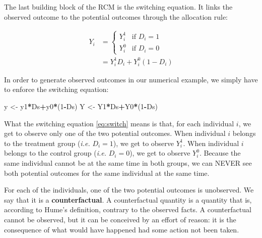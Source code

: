 \documentclass[]{book}
\newenvironment{Shaded}{\begin{snugshade}}{\end{snugshade}}
\newcommand{\DecValTok}[1]{\textcolor[rgb]{0.00,0.00,0.81}{#1}}
\newcommand{\StringTok}[1]{\textcolor[rgb]{0.31,0.60,0.02}{#1}}
\newcommand{\OperatorTok}[1]{\textcolor[rgb]{0.81,0.36,0.00}{\textbf{#1}}}
\newcommand{\NormalTok}[1]{#1}
\theoremstyle{definition}
\theoremstyle{definition}
\theoremstyle{definition}
\theoremstyle{remark}
\let\BeginKnitrBlock\begin \let\EndKnitrBlock\end
\begin{document}
The last building block of the RCM is the switching equation. It links
the observed outcome to the potential outcomes through the allocation
rule:

\begin{align}
 \label{eq:switch}
  Y_i & = 
    \begin{cases}
    Y_i^1 & \text{if } D_i=1\\
    Y_i^0 & \text{if } D_i=0
    \end{cases} \\
    & = Y_i^1D_i + Y_i^0(1-D_i) \nonumber
\end{align}

\BeginKnitrBlock{example}
\protect\hypertarget{exm:unnamed-chunk-4}{}{\label{exm:unnamed-chunk-4} }In
order to generate observed outcomes in our numerical example, we simply
have to enforce the switching equation:
\EndKnitrBlock{example}

\begin{Shaded}
\begin{Highlighting}[]
\NormalTok{y <-}\StringTok{ }\NormalTok{y1}\OperatorTok{*}\NormalTok{Ds}\OperatorTok{+}\NormalTok{y0}\OperatorTok{*}\NormalTok{(}\DecValTok{1}\OperatorTok{-}\NormalTok{Ds)}
\NormalTok{Y <-}\StringTok{ }\NormalTok{Y1}\OperatorTok{*}\NormalTok{Ds}\OperatorTok{+}\NormalTok{Y0}\OperatorTok{*}\NormalTok{(}\DecValTok{1}\OperatorTok{-}\NormalTok{Ds)}
\end{Highlighting}
\end{Shaded}

What the switching equation \eqref{eq:switch} means is that, for each
individual \(i\), we get to observe only one of the two potential
outcomes. When individual \(i\) belongs to the treatment group
(\emph{i.e.} \(D_i=1\)), we get to observe \(Y_i^1\). When individual
\(i\) belongs to the control group (\emph{i.e.} \(D_i=0\)), we get to
observe \(Y_i^0\). Because the same individual cannot be at the same
time in both groups, we can NEVER see both potential outcomes for the
same individual at the same time.

For each of the individuals, one of the two potential outcomes is
unobserved. We say that it is a \textbf{counterfactual}. A
counterfactual quantity is a quantity that is, according to Hume's
definition, contrary to the observed facts. A counterfactual cannot be
observed, but it can be conceived by an effort of reason: it is the
consequence of what would have happened had some action not been taken.
\end{document}
